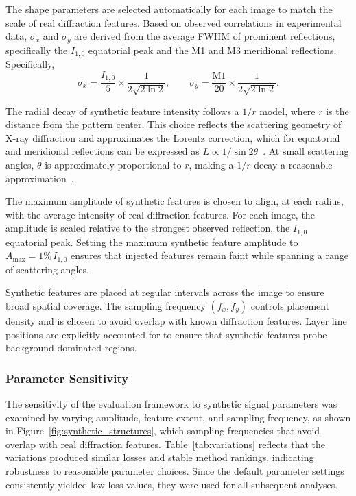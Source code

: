 \documentclass[iucr]{iucrjournals}
\begin{document}
The shape parameters are selected automatically for each image to match the scale of real diffraction features. Based on observed correlations in experimental data, $\sigma_x$ and $\sigma_y$ are derived from the average FWHM of prominent reflections, specifically the $I_{1,0}$ equatorial peak and the M1 and M3 meridional reflections. Specifically,
\begin{equation}
\sigma_x = \frac{I_{1,0}}{5} \times \frac{1}{2\sqrt{2\ln2}}, 
\qquad
\sigma_y = \frac{\mathrm{M1}}{20} \times \frac{1}{2\sqrt{2\ln2}}.
\end{equation}

The radial decay of synthetic feature intensity follows a $1/r$ model, where $r$ is the distance from the pattern center. This choice reflects the scattering geometry of X-ray diffraction and approximates the Lorentz correction, which for equatorial and meridional reflections can be expressed as $L \propto 1/\sin 2\theta$~\cite{Buerger1940}. At small scattering angles, $\theta$ is approximately proportional to $r$, making a $1/r$ decay a reasonable approximation~\cite{Denny1995}.

The maximum amplitude of synthetic features is chosen to align, at each radius, with the average intensity of real diffraction features. For each image, the amplitude is scaled relative to the strongest observed reflection, the $I_{1,0}$ equatorial peak. Setting the maximum synthetic feature amplitude to $A_{\mathrm{max}} = 1\%\, I_{1,0}$ ensures that injected features remain faint while spanning a range of scattering angles.

Synthetic features are placed at regular intervals across the image to ensure broad spatial coverage. The sampling frequency $(f_x, f_y)$ controls placement density and is chosen to avoid overlap with known diffraction features. Layer line positions are explicitly accounted for to ensure that synthetic features probe background-dominated regions.

\subsubsection{Parameter Sensitivity}

The sensitivity of the evaluation framework to synthetic signal parameters was examined by varying amplitude, feature extent, and sampling frequency, as shown in Figure~\ref{fig:synthetic_structures}, which sampling frequencies that avoid overlap with real diffraction features. Table~\ref{tab:variations} reflects that the variations produced similar losses and stable method rankings, indicating robustness to reasonable parameter choices. Since the default parameter settings consistently yielded low loss values, they were used for all subsequent analyses.
\end{document}
